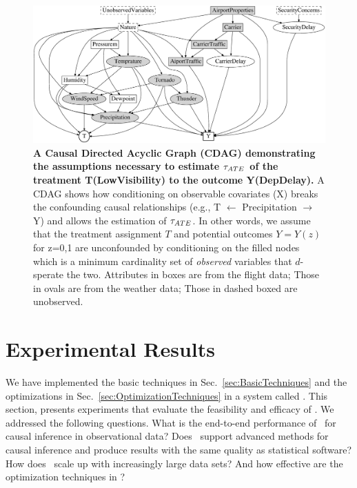 

\begin{figure}
  \centering
    \includegraphics[width=1.1\linewidth]{Figures/dag.eps}
\caption{ {\bf \small A Causal Directed Acyclic Graph (CDAG)  demonstrating
    the assumptions necessary to estimate ${\tau_{ATE}}$ of the treatment
    T(LowVisibility) to the outcome Y(DepDelay).}  A CDAG shows how conditioning on observable covariates (X)
breaks the confounding causal relationships (e.g., T  $\leftarrow$ Precipitation
$\rightarrow$ Y) and allows the estimation of ${\tau_{ATE}}$. In other words, we assume that the treatment assignment $T$
and potential outcomes $Y=Y(z)$ for z=0,1 are unconfounded
by conditioning on the filled nodes which is a minimum cardinality set of {\em observed} variables that $d$-sperate the two. Attributes in boxes are from the flight data; Those in ovals are from the weather data; Those in dashed boxed are unobserved.}
\label{fig:dag}
\end{figure}

\section{Experimental Results}
\label{sec:exp}

We have implemented the basic techniques in
Sec.~\ref{sec:BasicTechniques} and the optimizations in
Sec.~\ref{sec:OptimizationTechniques} in a system called \GSQL.  This
section, presents experiments that evaluate the feasibility and
efficacy of \GSQL.  We addressed the following questions.  What is the
end-to-end performance of \GSQL \ for causal inference in
observational data?  Does \GSQL \ support advanced methods for causal
inference and produce results with the same quality as statistical
software? How does \GSQL\ scale up with increasingly large data sets?
And how effective are the optimization techniques in \GSQL?

\vspace{-.2cm}

